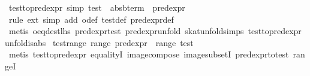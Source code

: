 \begin{isabellebody}
\ test{}to{}pred{}expr\ {}simp{}{}\ {}test\ {}\ abs{}bterm\ {}\ pred{}expr{}\isanewline
%
\isadelimproof
\ \ %
\endisadelimproof
%
\isatagproof
{}\isamarkupfalse%
\ {}rule\ ext{}\ simp\ add{}\ o{}def\ test{}def\ pred{}expr{}def{}\isanewline
\ \ \isamarkupfalse%
\ {}metis\ o{}eq{}dest{}lhs\ pred{}expr{}test\ pred{}expr{}unfold\ skat{}unfold{}simps{}{}{}\ test{}to{}pred{}expr\ unfold{}is{}abs{}%
\endisatagproof
{\isafoldproof}%
%
\isadelimproof
\isanewline
%
\endisadelimproof
\isanewline
{}\isamarkupfalse%
\ test{}range{}\ {}range\ pred{}expr\ {}\ range\ test{}\isanewline
%
\isadelimproof
\ \ %
\endisadelimproof
%
\isatagproof
{}\isamarkupfalse%
\ {}metis\ test{}to{}pred{}expr\ equalityI\ image{}compose\ image{}subsetI\ pred{}expr{}to{}test\ rangeI{}%

\end{isabellebody}
